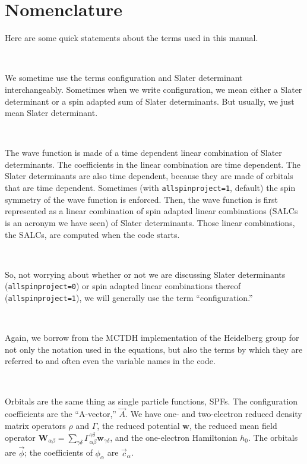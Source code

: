 \documentclass[10pt,leqno, oneside]{book}
\begin{document}
\section{Nomenclature}

Here are some quick statements about the terms used in this manual.

\

We sometime use the terms configuration and Slater determinant 
interchangeably.  Sometimes when we write configuration, we mean either a Slater determinant or a spin adapted sum
of Slater determinants.  But usually, we just mean Slater determinant.

\

The wave function is made of a time dependent linear combination of Slater determinants.  The coefficients in the linear
combination are time dependent.  The Slater determinants are also time dependent, because they are made of orbitals
that are time dependent.  Sometimes (with \verb#allspinproject=1#, default) the spin symmetry of the wave function is
enforced.  Then, the wave function is first represented as a linear combination of spin adapted linear combinations (SALCs
is an acronym we have seen) of Slater determinants.  Those linear combinations, the SALCs, are computed when the code starts.

\

So, not worrying about whether or not we are discussing Slater determinants (\verb#allspinproject=0#) or spin adapted linear
combinations thereof (\verb#allspinproject=1#), we will generally use the term ``configuration.''  

\

Again, we borrow from the MCTDH implementation of the Heidelberg group for not only the notation used in the equations,
but also the terms by which they are referred to and often even the variable names in the code.

\
 
Orbitals are the same thing as single particle functions, SPFs.  The configuration coefficients
are the ``A-vector,'' $\vec{A}$.  We have one- and two-electron reduced density matrix operators $\rho$ and $\Gamma$,
the reduced potential $\mathbf{w}$,
the reduced mean field operator
$\mathbf{W}_{\alpha\beta}=\sum_{\gamma\delta} \Gamma_{\alpha\beta}^{\gamma\delta}\mathbf{w}_{\gamma\delta}$, and
the one-electron Hamiltonian $h_0$.  The orbitals are $\vec{\phi}$; the coefficients of $\phi_\alpha$ are $\vec{c}_\alpha$.

\
\end{document}
